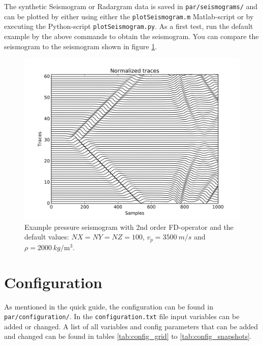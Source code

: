 \documentclass[pdftex,a4paper,parskip,listof=totoc,bibliography=totoc,onehalfspacing,12pt]{scrreprt}
\newcommand{\shellcmd}[1]{\indent\indent\texttt{#1}}	%
\begin{document}
The synthetic Seismogram or Radargram data is saved in \shellcmd{par/seismograms/} and can be plotted by either using either the \shellcmd{plotSeismogram.m} Matlab-script or by executing the Python-script \shellcmd{plotSeismogram.py}.
As a first test, run the default example by the above commands to obtain the seismogram. You can compare the seismogram to the seismogram shown in figure \ref{fig:Seismogram}.

\begin{figure}[h!]
\centering
	\includegraphics[width = .8\textwidth]{images/Test_Seismogram.png}
	\caption[Example pressure seismogram.]{Example pressure seismogram with 2nd order FD-operator and the default values: $NX=NY=NZ=100$, $v_p=\SI{3500}{m\per s}$ and $\rho = \SI{2000}{kg\per\cubic\metre}$.}\label{fig:Seismogram}
\end{figure}

\section{Configuration}\label{sec:config}
As mentioned in the quick guide, the configuration can be found in \shellcmd{par/configuration/}. In the \shellcmd{configuration.txt} file input variables can be added or changed. A list of all variables and config parameters that can be added and changed can be found in tables \ref{tab:config_grid} to \ref{tab:config_snapshots}.
\end{document}
